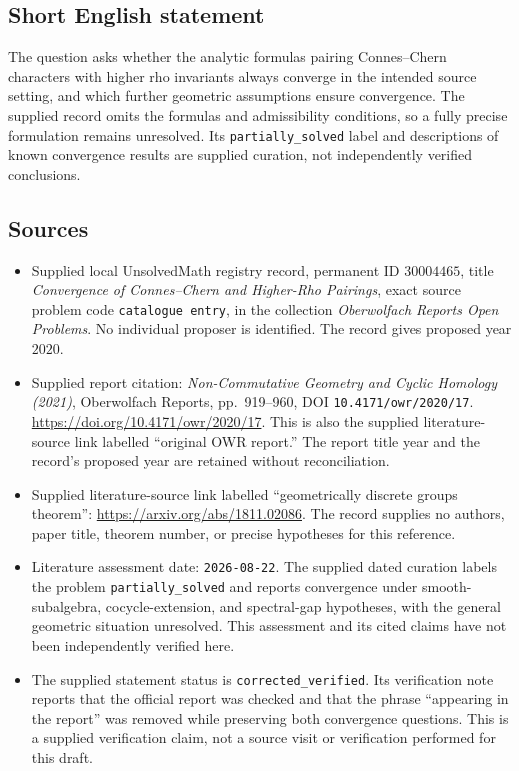\documentclass[11pt]{article}
\begin{document}
\subsection{Short English statement}
The question asks whether the analytic formulas pairing Connes--Chern characters with higher rho invariants always converge in the intended source setting, and which further geometric assumptions ensure convergence. The supplied record omits the formulas and admissibility conditions, so a fully precise formulation remains unresolved. Its \texttt{partially\_solved} label and descriptions of known convergence results are supplied curation, not independently verified conclusions.
\subsection{Sources}
\begin{itemize}
\item Supplied local UnsolvedMath registry record, permanent ID \(30004465\), title \emph{Convergence of Connes--Chern and Higher-Rho Pairings}, exact source problem code \texttt{catalogue entry}, in the collection \emph{Oberwolfach Reports Open Problems}. No individual proposer is identified. The record gives proposed year \(2020\).
\item Supplied report citation: \emph{Non-Commutative Geometry and Cyclic Homology (2021)}, Oberwolfach Reports, pp.~919--960, DOI \texttt{10.4171/owr/2020/17}. \url{https://doi.org/10.4171/owr/2020/17}. This is also the supplied literature-source link labelled ``original OWR report.'' The report title year and the record's proposed year are retained without reconciliation.
\item Supplied literature-source link labelled ``geometrically discrete groups theorem'': \url{https://arxiv.org/abs/1811.02086}. The record supplies no authors, paper title, theorem number, or precise hypotheses for this reference.
\item Literature assessment date: \texttt{2026-08-22}. The supplied dated curation labels the problem \texttt{partially\_solved} and reports convergence under smooth-subalgebra, cocycle-extension, and spectral-gap hypotheses, with the general geometric situation unresolved. This assessment and its cited claims have not been independently verified here.
\item The supplied statement status is \texttt{corrected\_verified}. Its verification note reports that the official report was checked and that the phrase ``appearing in the report'' was removed while preserving both convergence questions. This is a supplied verification claim, not a source visit or verification performed for this draft.
\end{itemize}
\end{document}
